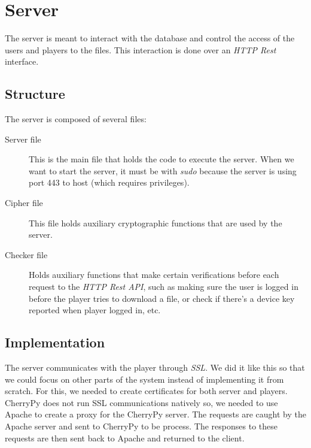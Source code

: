 \documentclass[11pt,a4paper]{report}
\begin{document}
\section{Server}
The server is meant to interact with the database and control the access of the users and players to the files.
This interaction is done over an \emph{HTTP Rest} interface.
 
\subsection{Structure}
The server is composed of several files:

\begin{description}
  \item[Server file] This is the main file that holds the code to execute the server. When we want to start the server, it must be with \emph{sudo} because the server is using port 443 to host (which requires privileges).
  \item[Cipher file] This file holds auxiliary cryptographic functions that are used by the server.
  \item[Checker file] Holds auxiliary functions that make certain verifications before each request to the \emph{HTTP Rest API}, such as making sure the user is logged in before the player tries to download a file, or check if there's a device key reported when player logged in, etc.
\end{description}

\subsection{Implementation}
The server communicates with the player through \emph{SSL}. We did it like this so that we could focus on other parts of the system instead of implementing it from scratch.
For this, we needed to create certificates for both server and players.
\newline CherryPy does not run SSL communications natively so, we needed to use Apache to create a proxy for the CherryPy server. The requests are caught by the Apache server and sent to CherryPy to be process. The responses to these requests are then sent back to Apache and returned to the client.
\end{document}
